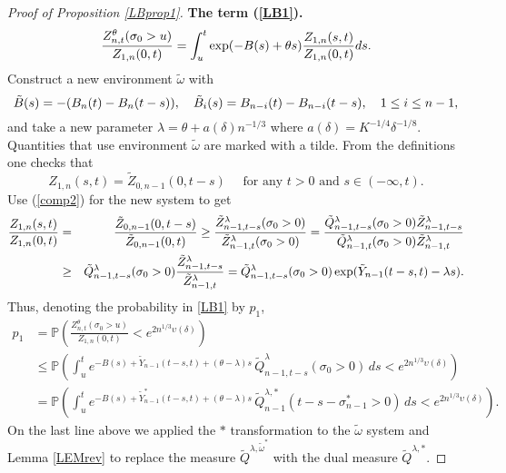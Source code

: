 \documentclass[11pt]{amsart}
\numberwithin{equation}{section}
\theoremstyle{remark}
\begin{document}
\begin{proof}[Proof of Proposition \ref{LBprop1}]
\medskip
\noindent \textbf{The term (\ref{LB1}).} 
\begin{equation} {\nonumber} 
\frac{Z^{\theta}_{n,t}( \sigma_0>u)}{Z_{1,n}(0,t)}=\int_u^t \exp(-B(s)+{\theta} s) \frac{Z_{1,n}(s,t)}{Z_{1,n}(0,t)} ds.
\end{equation} 
Construct a new environment $\tilde{\omega}$  with 
\begin{equation}{\nonumber} 
\tilde B(s)=-(B_n(t)-B_n(t-s)), \quad \tilde B_i(s)=B_{n-i}(t)-B_{n-i}(t-s), \quad 1\le i \le n-1, 
\end{equation}
and take a new parameter $\lambda={\theta}+a(\delta) n^{-1/3}$ where $a(\delta)=K^{-1/4} \delta^{-1/8}$.
Quantities  that use environment $\tilde{\omega}$ are marked with a tilde. 
From the definitions one checks that 
\begin{equation}
Z_{1,n}(s,t)=\tilde Z_{0,n-1}(0,t-s) \quad\text{ for any $t>0$ and  $s\in(-\infty,t)$.} 
\label{ZZtil}\end{equation}
Use  (\ref{comp2}) for the new system to get
\begin{eqnarray} {\nonumber} 
\frac{Z_{1,n}(s,t)}{Z_{1,n}(0,t)}&=&\frac{\tilde Z_{0,n-1}(0,t-s)}{\tilde Z_{0,n-1}(0,t)}\ge \frac{{\tilde Z}_{n-1,t-s}^{\lambda}(\sigma_0>0)}{{\tilde Z}_{n-1,t}^{\lambda}(\sigma_0>0)}=\frac{\tilde Q^\lambda_{n-1,t-s}(\sigma_0>0) {\tilde Z}_{n-1,t-s}^{\lambda}}{\tilde Q^\lambda_{n-1,t}(\sigma_0>0){\tilde Z}_{n-1,t}^{\lambda}}\\
{\nonumber} &\ge&\tilde Q^\lambda_{n-1,t-s}(\sigma_0>0)\frac{ {\tilde Z}_{n-1,t-s}^{\lambda}}{{\tilde Z}_{n-1,t}^{\lambda}}=
\tilde Q^\lambda_{n-1,t-s}(\sigma_0>0) \exp(\tilde Y_{n-1}(t-s,t)-\lambda s).
\end{eqnarray} 
Thus, denoting   the probability in \eqref{LB1}  by $p_1$, 
\begin{align*}
p_1&={\mathbb{P}}\left(\frac{Z^{\theta}_{n,t}( \sigma_0>u)}{Z_{1,n}(0,t)}<e^{2 n^{1/3} \upsilon(\delta)}\right)\\ 
&\le 
{\mathbb{P}}\left(
\int_u^t  e^{-B(s)+\tilde Y_{n-1}(t-s,t)+({\theta}-\lambda) s}
\,\tilde Q^\lambda_{n-1,t-s}(\sigma_0>0) \,ds<e^{2 n^{1/3} \upsilon(\delta)}
\right) \\
&=  {\mathbb{P}}\left(
\int_u^t  e^{-B(s)+\tilde Y^*_{n-1}(t-s,t)+({\theta}-\lambda) s}
\,\tilde Q^{\lambda,*}_{n-1}(t-s-\sigma^*_{n-1}>0) \,ds<e^{2 n^{1/3} \upsilon(\delta)}
\right).   
\end{align*}
On the last line above we applied the $*$ transformation to the $\tilde \omega$ system and Lemma \ref{LEMrev} 
to replace the measure $\tilde Q^{\lambda, \tilde {\omega}^*}$ with the dual measure $\tilde Q^{\lambda,*}$.  


\end{proof}
\end{document}
